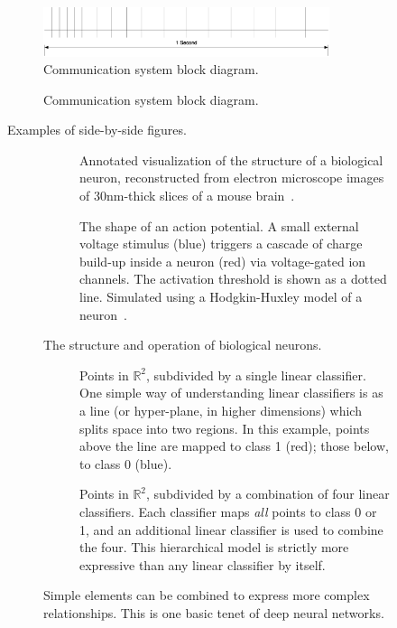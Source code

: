 \documentclass{book}\usepackage[]{graphicx}\usepackage[]{color}
\begin{document}
\begin{figure}[hbt] %
\centering
  \includegraphics[width=3.3in]{line-spaces.eps}
\caption{Communication system block diagram.}
\label{ch01.fig1} 
\end{figure}

\begin{figure}[hbt] %
\centering
  \figboxes
\caption{Communication system block diagram.}
\label{ch01.fig2} 
\end{figure}

Examples of side-by-side figures.

\begin{figure}[hbt]%
\centering
\begin{subfigure}[t]{0.45\textwidth}%
	\smfigboxes
\caption{Annotated visualization of the structure of a biological neuron, reconstructed from electron microscope images of 30nm-thick slices of a mouse 
brain~\cite{tesniere59}.}%
\label{fig:bioneuron}%
\end{subfigure}%
\qquad%
\begin{subfigure}[t]{0.45\textwidth}%
	\smfigboxes
\caption{The shape of an action potential. A small external voltage stimulus (blue) triggers a cascade of charge build-up inside a neuron (red) via voltage-gated ion channels. The activation threshold is shown as a dotted line. Simulated using a Hodgkin-Huxley model of a neuron~\protect\cite{weber-97}.}%
\label{fig:ap}%
\end{subfigure}%
\caption{The structure and operation of biological neurons.}%
\end{figure}

\begin{figure}[b]
\centering
\begin{subfigure}[t]{0.45\textwidth}
	\smfigboxes
\caption{Points in $\mathbb{R}^2$, subdivided by a single linear classifier. One simple way of understanding linear classifiers is as a line (or hyper-plane, in higher dimensions) which splits space into two regions. In this example, points above the line are mapped to class 1 (red); those below, to class 0 (blue).}
\label{subfig:linclass}
\end{subfigure}%
\qquad%
\begin{subfigure}[t]{0.45\textwidth}
	\smfigboxes
\caption{Points in $\mathbb{R}^2$, subdivided by a combination of four linear classifiers. Each classifier maps \emph{all} points to class 0 or 1, and an additional linear classifier is used to combine the four. This hierarchical model is strictly more expressive than any linear classifier by itself.}
\label{subfig:circclass}
\end{subfigure}%
\caption{Simple elements can be combined to express more complex relationships.
This is one basic tenet of deep neural networks.}
\label{fig:classifiers}
\end{figure}
\end{document}
